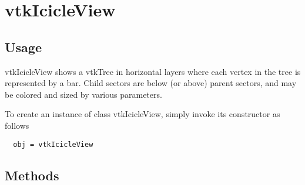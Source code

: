 \section{vtkIcicleView}

\subsection{Usage}

 vtkIcicleView shows a vtkTree in horizontal layers
 where each vertex in the tree is represented by a bar.
 Child sectors are below (or above) parent sectors, and may be
 colored and sized by various parameters.

To create an instance of class vtkIcicleView, simply
invoke its constructor as follows
\begin{verbatim}
  obj = vtkIcicleView
\end{verbatim}
\subsection{Methods}

